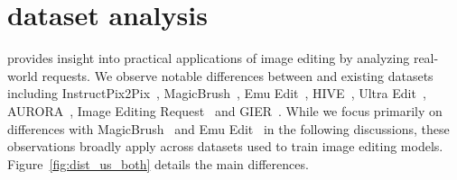 \section{\RealEdit dataset analysis}
\label{sec:dataset_analysis}

\RealEdit provides insight into practical applications of image editing by analyzing real-world requests. We observe notable differences between \RealEdit and existing datasets including InstructPix2Pix~\cite{brooks2023instructpix2pix}, MagicBrush~\cite{zhang2024magicbrush}, Emu Edit~\cite{sheynin2024emu}, HIVE~\cite{zhang2024hive}, Ultra Edit~\cite{zhao2024ultraedit}, AURORA~\cite{krojer2024learning}, Image Editing Request~\cite{tan2019expressing} and GIER~\cite{shi2020benchmark}. 
While we focus primarily on differences with MagicBrush~\cite{zhang2024magicbrush} and Emu Edit~\cite{sheynin2024emu} in the following discussions, these observations broadly apply across datasets used to train image editing models. Figure~\ref{fig:dist_us_both} details the main differences. %


